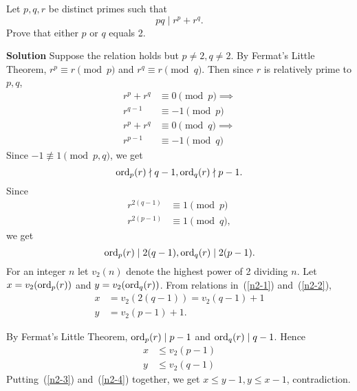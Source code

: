 \begin{ex}
Let $p,q,r$ be distinct primes such that
\[pq\mid r^p+r^q.\]
Prove that either $p$ or $q$ equals 2.
\end{ex}

\textbf{Solution} Suppose the relation holds but $p\neq 2,q\neq 2$. By Fermat's Little Theorem, $r^p\equiv r\pmod{p}$ and $r^q\equiv r\pmod{q}$. Then since $r$ is relatively prime to $p,q$,
\begin{align*}
r^p+r^q&\equiv 0\pmod{p}\implies\\
r^{q-1}&\equiv -1 \pmod{p}\\
r^p+r^q&\equiv 0\pmod{q}\implies\\
r^{p-1}&\equiv -1 \pmod{q}
\end{align*}
Since $-1\not \equiv 1\pmod{p,q}$, we get 
\begin{equation}\operatorname{ord}_p (r)\nmid q-1,\operatorname{ord}_q (r) \nmid p-1.
\label{n2-1}
\end{equation}
 Since
\begin{align*}
r^{2(q-1)}&\equiv 1 \pmod{p}\\
r^{2(p-1)}&\equiv 1 \pmod{q},
\end{align*}
we get
\begin{equation}\operatorname{ord}_p (r)\mid 2(q-1),\operatorname{ord}_q (r) \mid 2(p-1).
\label{n2-2}
\end{equation}
For an integer $n$ let $v_2(n)$ denote the highest power of 2 dividing $n$. Let $x=v_2(\operatorname{ord}_p (r))$ and $y=v_2(\operatorname{ord}_q(r))$. From relations in~(\ref{n2-1}) and~(\ref{n2-2}),
\begin{align}
\nonumber x&= v_2 (2(q-1))=v_2(q-1)+1\\
y&= v_2(p-1)+1.\label{n2-3}
\end{align}

By Fermat's Little Theorem, $\operatorname{ord}_p (r)\mid p-1$ and $\operatorname{ord}_q (r)\mid q-1$. Hence
\begin{align}
\nonumber x&\leq v_2 (p-1)\\
y&\leq v_2(q-1)\label{n2-4}
\end{align}
Putting~(\ref{n2-3}) and~(\ref{n2-4}) together, we get $x\leq y-1, y\leq x-1$, contradiction.%


